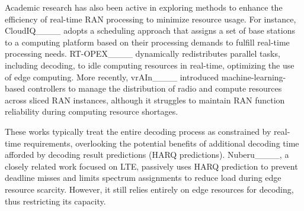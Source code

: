 Academic research has also been active in exploring methods to enhance the efficiency of real-time RAN processing to minimize resource usage. For instance, CloudIQ____ adopts a scheduling approach that assigns a set of base stations to a computing platform based on their processing demands to fulfill real-time processing needs. RT-OPEX____ dynamically redistributes parallel tasks, including decoding, to idle computing resources in real-time, optimizing the use of edge computing. More recently, vrAIn____ introduced machine-learning-based controllers to manage the distribution of radio and compute resources across sliced RAN instances, although it struggles to maintain RAN function reliability during computing resource shortages.
\iffalse
These works typically treat the entirety of the decoding process as constrained by real-time requirements and do not leverage the potential benefits of additional decoding time afforded by decoding result predictions (or HARQ predictions). In this context, Nuberu____ emerged as a work closely related to \Name{}, albeit focusing on LTE. Nuberu passively employs HARQ prediction to prevent deadline misses in LTE, further limiting spectrum assignments as a form of computing congestion control to reduce load during edge resource scarcity. However, its approach still depends entirely on edge resources for decoding processes, thus limiting its capacity for decoding. As comparison in table~\ref{tab:related}, \Name{} introduces an innovative decoding scheduling framework that actively utilizes HARQ prediction, pre-parsing for packet subheaders and intelligently manages resource allocation between edge and remote servers, enhancing overall system efficiency and capability. 
\fi 

These works typically treat the entire decoding process as constrained by real-time requirements, overlooking the potential benefits of additional decoding time afforded by decoding result predictions (HARQ predictions). Nuberu____, a closely related work focused on LTE, passively uses HARQ prediction to prevent deadline misses and limits spectrum assignments to reduce load during edge resource scarcity. However, it still relies entirely on edge resources for decoding, thus restricting its capacity.
